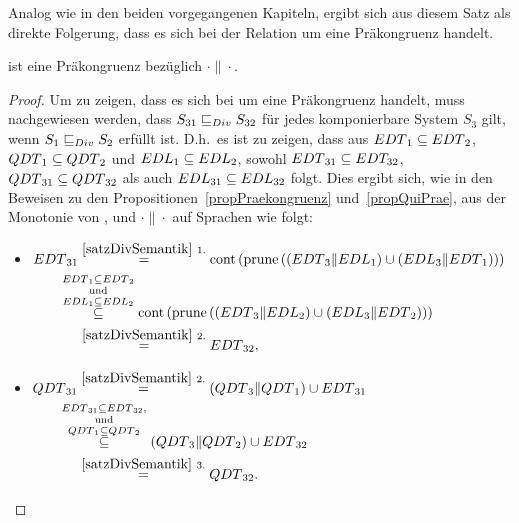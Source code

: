 Analog wie in den beiden vorgegangenen Kapiteln, ergibt sich aus diesem Satz
als direkte Folgerung, dass es sich bei der Relation \DRel{} um eine
Präkongruenz handelt.

\begin{prop}
\label{propDivPrae}
  \DRel{} ist eine Präkongruenz bezüglich $\cdot\|\cdot$.
\end{prop}

\begin{proof}
  Um zu zeigen, dass es sich bei \DRel{} um eine Präkongruenz handelt, muss
  nachgewiesen werden, dass $S_{31}\sqsubseteq _{Div}{} S_{32}$ für jedes komponierbare
  System $S_3$ gilt, wenn $S_1\sqsubseteq _{Div}{} S_2$ erfüllt ist.  D.h.\ es ist
  zu zeigen, dass aus $EDT{}_1\subseteq EDT{}_2$, $QDT{}_1\subseteq
  QDT{}_2$ und $EDL{}_1\subseteq EDL{}_2$, sowohl $EDT{}_{31}\subseteq
  EDT_{32}$, $QDT{}_{31}\subseteq QDT{}_{32}$ als auch $EDL{}_{31}\subseteq
  EDL{}_{32}$ folgt. Dies ergibt sich, wie in den Beweisen zu den
  Propositionen~\ref{propPraekongruenz} und~\ref{propQuiPrae}, aus der
  Monotonie von \cont{}, \prune{} und $\cdot\|\cdot$ auf Sprachen wie folgt:
  \begin{itemize}
    \item $\begin{aligned}[t]
        \EDT{}_{31} &\overset{\ref{satzDivSemantik}~1.}{=}
        \cont{}\left(\prune{}\left(\left(\EDT{}_3\|\EDL{}_1\right) \cup
        \left(\EDL{}_3\|\EDT{}_1\right)\right)\right)\\
        &\hspace{-0.5cm}\overset{\EDT{}_1\subseteq
      \EDT{}_2}{\overset{\mathrm{und}}{\overset{\EDL{}_1\subseteq
    \EDL{}_2}{\subseteq}}}
    \cont{}\left(\prune{}\left(\left(\EDT{}_3\|\EDL{}_2\right) \cup
        \left(\EDL{}_3\|\EDT{}_2\right)\right)\right)\\
      &\overset{\ref{satzDivSemantik}~2.}{=} \EDT{}_{32},
    \end{aligned}$
    \item $\begin{aligned}[t]
        \QDT{}_{31} &\overset{\ref{satzDivSemantik}~2.}{=} (\QDT{}_3\|\QDT{}_1)
        \cup \EDT{}_{31}\\
        &\hspace{-0.5cm}\overset{\EDT{}_{31}\subseteq
      \EDT{}_{32},}{\overset{\mathrm{und}}{\overset{\QDT{}_1\subseteq
      \QDT{}_2}{\subseteq}}} (\QDT{}_3\|\QDT{}_2) \cup \EDT{}_{32}\\
      &\overset{\ref{satzDivSemantik}~3.}{=} \QDT{}_{32}.
    \end{aligned}$
  \end{itemize}
\end{proof}

